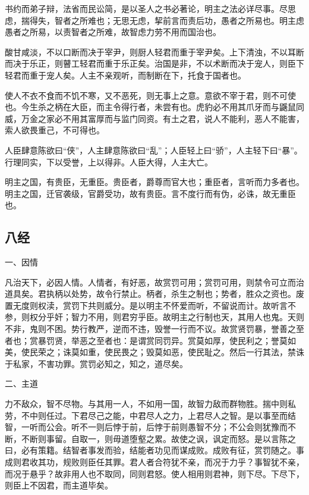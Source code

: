 \documentclass[]{article}
\begin{document}
书约而弟子辩，法省而民讼简，是以圣人之书必著论，明主之法必详尽事。尽思虑，揣得失，智者之所难也；无思无虑，挈前言而责后功，愚者之所易也。明主虑愚者之所易，以责智者之所难，故智虑力劳不用而国治也。

酸甘咸淡，不以口断而决于宰尹，则厨人轻君而重于宰尹矣。上下清浊，不以耳断而决于乐正，则瞽工轻君而重于乐正矣。治国是非，不以术断而决于宠人，则臣下轻君而重于宠人矣。人主不亲观听，而制断在下，托食于国者也。

使人不衣不食而不饥不寒，又不恶死，则无事上之意。意欲不宰于君，则不可使也。今生杀之柄在大臣，而主令得行者，未尝有也。虎豹必不用其爪牙而与鼷鼠同威，万金之家必不用其富厚而与监门同资。有土之君，说人不能利，恶人不能害，索人欲畏重己，不可得也。

人臣肆意陈欲曰``侠''，人主肆意陈欲曰``乱''；人臣轻上曰``骄''，人主轻下曰``暴''。行理同实，下以受誉，上以得非。人臣大得，人主大亡。

明主之国，有贵臣，无重臣。贵臣者，爵尊而官大也；重臣者，言听而力多者也。明主之国，迁官袭级，官爵受功，故有贵臣。言不度行而有伪，必诛，故无重臣也。

\hypertarget{header-n1591}{%
\subsection{八经}\label{header-n1591}}

一、因情

凡治天下，必因人情。人情者，有好恶，故赏罚可用；赏罚可用，则禁令可立而治道具矣。君执柄以处势，故令行禁止。柄者，杀生之制也；势者，胜众之资也。废置无度则权渎，赏罚下共则威分。是以明主不怀爱而听，不留说而计。故听言不参，则权分乎奸；智力不用，则君穷乎臣。故明主之行制也天，其用人也鬼。天则不非，鬼则不困。势行教严，逆而不违，毁誉一行而不议。故赏贤罚暴，誉善之至者也；赏暴罚贤，举恶之至者也：是谓赏同罚异。赏莫如厚，使民利之；誉莫如美，使民荣之；诛莫如重，使民畏之；毁莫如恶，使民耻之。然后一行其法，禁诛于私家，不害功罪。赏罚必知之，知之，道尽矣。

二、主道

力不敌众，智不尽物。与其用一人，不如用一国，故智力敌而群物胜。揣中则私劳，不中则任过。下君尽己之能，中君尽人之力，上君尽人之智。是以事至而结智，一听而公会。听不一则后悖于前，后悖于前则愚智不分；不公会则犹豫而不断，不断则事留。自取一，则毋道堕壑之累。故使之讽，讽定而怒。是以言陈之曰，必有策籍。结智者事发而验，结能者功见而谋成败。成败有征，赏罚随之。事成则君收其功，规败则臣任其罪。君人者合符犹不亲，而况于力乎？事智犹不亲，而况于悬乎？故非用人也不取同，同则君怒。使人相用则君神，则下尽。下尽下，则臣上不因君，而主道毕矣。
\end{document}
